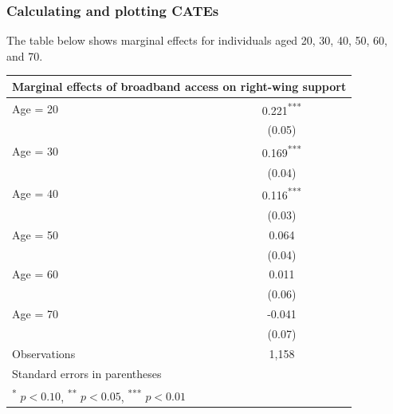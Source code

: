 \documentclass[12pt,english,dvipsnames,aspectratio=169,handout]{beamer}\usepackage[]{graphicx}\usepackage[]{xcolor}
\begin{document}
\begin{frame}
  \frametitle{Calculating and plotting CATEs}
\footnotesize

The table below shows marginal effects for individuals aged 20, 30, 40, 50, 60, and 70.

\tiny
\centering
\begin{tabular}{l*{1}{c}}
\toprule
\multicolumn{2}{c}{Marginal effects of broadband access on right-wing support}\\
\midrule
Age = 20          &    0.221\textsuperscript{***}\\
                &   (0.05)         \\
Age = 30          &    0.169\textsuperscript{***}\\
                &   (0.04)         \\
Age = 40          &    0.116\textsuperscript{***}\\
                &   (0.03)         \\
Age = 50          &    0.064         \\
                &   (0.04)         \\
Age = 60           &    0.011         \\
                &   (0.06)         \\
Age = 70          &   -0.041         \\
                &   (0.07)         \\
\midrule
Observations    &     1,158         \\
\bottomrule
\multicolumn{2}{l}{Standard errors in parentheses}\\
\multicolumn{2}{l}{\textsuperscript{*} \(p<0.10\), \textsuperscript{**} \(p<0.05\), \textsuperscript{***} \(p<0.01\)}\\
\end{tabular}

\end{frame}
\end{document}
